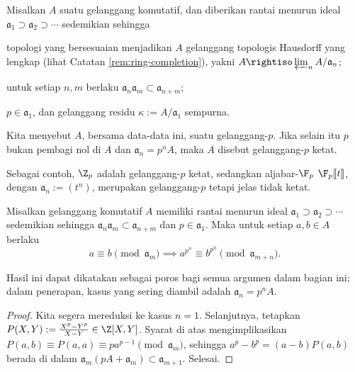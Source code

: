 \begin{definition}\label{def:p-ring} 
	Misalkan $A$ suatu gelanggang komutatif, dan diberikan rantai menurun ideal $\mathfrak{a}_1 \supset \mathfrak{a}_2 \supset \cdots$ sedemikian sehingga
	\begin{compactitem}
		\item topologi yang bersesuaian menjadikan $A$ gelanggang topologis Hausdorff yang lengkap (lihat Catatan \ref{rem:ring-completion}), yakni $A \rightiso \varprojlim_n A/\mathfrak{a}_n$;
		\item untuk setiap $n, m$ berlaku $\mathfrak{a}_n \mathfrak{a}_m \subset \mathfrak{a}_{n+m}$;
		\item $p \in \mathfrak{a}_1$, dan gelanggang residu $\kappa := A/\mathfrak{a}_1$ sempurna.
	\end{compactitem}
	Kita menyebut $A$, bersama data-data ini, suatu gelanggang-$p$. Jika selain itu $p$ bukan pembagi nol di $A$ dan $\mathfrak{a}_n = p^n A$, maka $A$ disebut gelanggang-$p$ ketat.
\end{definition}
Sebagai contoh, $\Z_p$ adalah gelanggang-$p$ ketat, sedangkan aljabar-$\F_p$ $\F_p \llbracket t \rrbracket$, dengan $\mathfrak{a}_n := (t^n)$, merupakan gelanggang-$p$ tetapi jelas tidak ketat.

\begin{lemma}\label{prop:aux-p-power}
	Misalkan gelanggang komutatif $A$ memiliki rantai menurun ideal $\mathfrak{a}_1 \supset \mathfrak{a}_2 \supset \cdots$ sedemikian sehingga $\mathfrak{a}_n \mathfrak{a}_m \subset \mathfrak{a}_{n+m}$ dan $p \in \mathfrak{a}_1$. Maka untuk setiap $a,b \in A$ berlaku
	\[ a \equiv b \pmod{\mathfrak{a}_m} \implies a^{p^n} \equiv b^{p^n} \pmod{\mathfrak{a}_{m+n}}. \]
\end{lemma}
Hasil ini dapat dikatakan sebagai poros bagi semua argumen dalam bagian ini; dalam penerapan, kasus yang sering diambil adalah $\mathfrak{a}_n = p^n A$.
\begin{proof}
	Kita segera mereduksi ke kasus $n=1$. Selanjutnya, tetapkan $P(X,Y) := \frac{X^p-Y^p}{X-Y} \in \Z[X,Y]$. Syarat di atas mengimplikasikan $P(a,b) \equiv P(a,a) \equiv pa^{p-1} \pmod{\mathfrak{a}_m}$, sehingga $a^p - b^p = (a-b) P(a,b)$ berada di dalam $\mathfrak{a}_m (pA + \mathfrak{a}_m) \subset \mathfrak{a}_{m+1}$. Selesai.
\end{proof}

